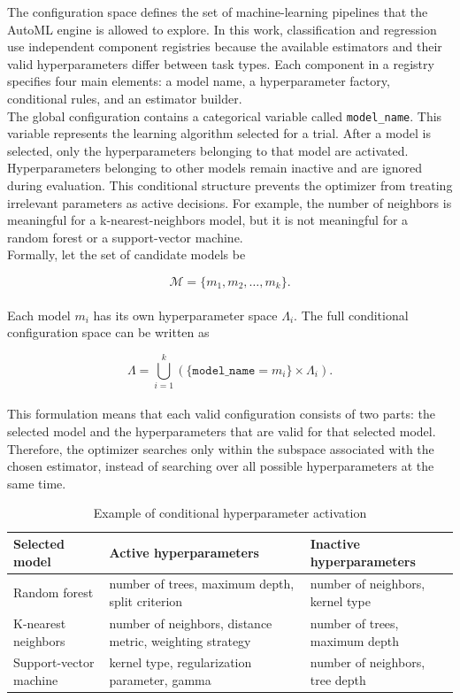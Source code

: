 \documentclass[12pt,a4paper]{report}
\begin{document}
The configuration space defines the set of machine-learning pipelines that the
AutoML engine is allowed to explore. In this work, classification and regression
use independent component registries because the available estimators and their
valid hyperparameters differ between task types. Each component in a registry
specifies four main elements: a model name, a hyperparameter factory, conditional
rules, and an estimator builder.
\\
The global configuration contains a categorical variable called
\texttt{model\_name}. This variable represents the learning algorithm selected
for a trial. After a model is selected, only the hyperparameters belonging to
that model are activated. Hyperparameters belonging to other models remain
inactive and are ignored during evaluation. This conditional structure prevents
the optimizer from treating irrelevant parameters as active decisions. For
example, the number of neighbors is meaningful for a k-nearest-neighbors model,
but it is not meaningful for a random forest or a support-vector machine.
\\
Formally, let the set of candidate models be

\[
\mathcal{M} = \{m_1, m_2, \ldots, m_k\}.
\]
\\
Each model \(m_i\) has its own hyperparameter space \(\Lambda_i\). The full
conditional configuration space can be written as

\[
\Lambda =
\bigcup_{i=1}^{k}
\left(
\{\texttt{model\_name} = m_i\} \times \Lambda_i
\right).
\]
\\
This formulation means that each valid configuration consists of two parts: the
selected model and the hyperparameters that are valid for that selected model.
Therefore, the optimizer searches only within the subspace associated with the
chosen estimator, instead of searching over all possible hyperparameters at the
same time.

\begin{table}[H]
\centering
\caption{Example of conditional hyperparameter activation}
\label{tab:gp-automl-conditional-hyperparameters}
\begin{tabular}{p{}p{}p{}}
\toprule
Selected model & Active hyperparameters & Inactive hyperparameters \\
\midrule
Random forest
& number of trees, maximum depth, split criterion
& number of neighbors, kernel type \\
\midrule
K-nearest neighbors
& number of neighbors, distance metric, weighting strategy
& number of trees, maximum depth \\
\midrule
Support-vector machine
& kernel type, regularization parameter, gamma
& number of neighbors, tree depth \\
\bottomrule
\end{tabular}
\end{table}
\end{document}
